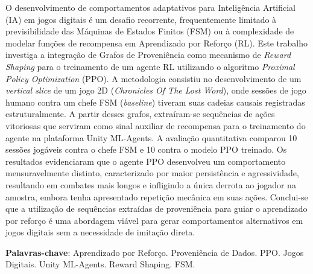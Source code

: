 \documentclass[
    12pt,                %
    openright,           %
    oneside,             %
    a4paper,             %
    chapter=TITLE,       %
    section=TITLE,       %
    english,             %
    brazil               %
]{abntex2}
\begin{document}
\begin{resumo}
    O desenvolvimento de comportamentos adaptativos para Inteligência Artificial (IA) em jogos digitais é um desafio recorrente, frequentemente limitado à previsibilidade das Máquinas de Estados Finitos (FSM) ou à complexidade de modelar funções de recompensa em Aprendizado por Reforço (RL). Este trabalho investiga a integração de Grafos de Proveniência como mecanismo de \textit{Reward Shaping} para o treinamento de um agente RL utilizando o algoritmo \textit{Proximal Policy Optimization} (PPO). A metodologia consistiu no desenvolvimento de um \textit{vertical slice} de um jogo 2D (\textit{Chronicles Of The Lost Word}), onde sessões de jogo humano contra um chefe FSM (\textit{baseline}) tiveram suas cadeias causais registradas estruturalmente. A partir desses grafos, extraíram-se sequências de ações vitoriosas que serviram como sinal auxiliar de recompensa para o treinamento do agente na plataforma Unity ML-Agents. A avaliação quantitativa comparou 10 sessões jogáveis contra o chefe FSM e 10 contra o modelo PPO treinado. Os resultados evidenciaram que o agente PPO desenvolveu um comportamento mensuravelmente distinto, caracterizado por maior persistência e agressividade, resultando em combates mais longos e infligindo a única derrota ao jogador na amostra, embora tenha apresentado repetição mecânica em suas ações. Conclui-se que a utilização de sequências extraídas de proveniência para guiar o aprendizado por reforço é uma abordagem viável para gerar comportamentos alternativos em jogos digitais sem a necessidade de imitação direta.

    \textbf{Palavras-chave}: Aprendizado por Reforço. Proveniência de Dados. PPO.
    Jogos Digitais. Unity ML-Agents. Reward Shaping. FSM.
\end{resumo}
\end{document}

